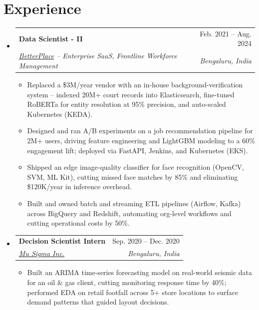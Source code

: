 \documentclass[letterpaper,11pt]{article}
\makeatletter
\newcommand{\resumeItem}[1]{
  \item\small{
    {#1 \vspace{-2pt}}
  }
}
\newcommand{\resumeSubheading}[4]{
  \vspace{-2pt}\item
    \begin{tabular*}{0.97\textwidth}[t]{l@{\extracolsep{\fill}}r}
      \textbf{#1} & #2 \\
      \textit{\small#3} & \textit{\small #4} \\
    \end{tabular*}\vspace{-7pt}
}
\newcommand{\resumeSubHeadingListStart}{\begin{itemize}[leftmargin=0.15in, label={}]}
\newcommand{\resumeSubHeadingListEnd}{\end{itemize}}
\newcommand{\resumeItemListStart}{\begin{itemize}}
\newcommand{\resumeItemListEnd}{\end{itemize}\vspace{-5pt}}
\makeatother
\begin{document}
\section{Experience}
  \resumeSubHeadingListStart
\resumeSubheading
       {Data Scientist - II}{Feb. 2021 -- Aug. 2024}
      {\href{https://www.betterplace.co.in/about-us}{\underline{BetterPlace}} -- Enterprise SaaS, Frontline Workforce Management}{Bengaluru, India}
      \resumeItemListStart
        \resumeItem{Replaced a \$3M/year vendor with an in-house background-verification system --  indexed 20M+ court records into Elasticsearch, fine-tuned RoBERTa for entity resolution at 95\% precision, and auto-scaled Kubernetes (KEDA).}
        \resumeItem{Designed and ran A/B experiments on a job recommendation pipeline for 2M+ users, driving feature engineering and LightGBM modeling to a 60\% engagement lift; deployed via FastAPI, Jenkins, and Kubernetes (EKS).}
        \resumeItem{Shipped an edge image-quality classifier for face recognition (OpenCV, SVM, ML Kit), cutting missed face matches by 85\% and eliminating \$120K/year in inference overhead.}
        \resumeItem{Built and owned batch and streaming ETL pipelines (Airflow, Kafka) across BigQuery and Redshift, automating org-level workflows and cutting operational costs by 50\%.}
      \resumeItemListEnd


    \resumeSubheading
      {Decision Scientist Intern}{Sep. 2020 -- Dec. 2020}
      {\href{https://www.mu-sigma.com/}{\underline{Mu Sigma Inc.}}}{Bengaluru, India}
      \resumeItemListStart
        \resumeItem{Built an ARIMA time-series forecasting model on real-world seismic data for an oil \& gas client, cutting monitoring response time by 40\%; performed EDA on retail footfall across 5+ store locations to surface demand patterns that guided layout decisions.} 
      \resumeItemListEnd
    \vspace{-5pt}
  \resumeSubHeadingListEnd
\end{document}
